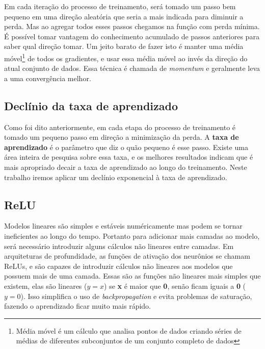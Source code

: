 Em cada iteração do processo de treinamento, será tomado um passo bem
pequeno em uma direção aleatória que seria a mais indicada para
diminuir a perda. Mas ao agregar todos esses passos chegamos na função
com perda mínima. É possível tomar vantagem do conhecimento acumulado
de passos anteriores para saber qual direção tomar. Um jeito barato de
fazer isto é manter uma média móvel\footnote{Média móvel é um cálculo
  que analisa pontos de dados criando séries de médias de diferentes
  subconjuntos de um conjunto completo de dados} de todos os
gradientes, e usar essa média móvel ao invés da direção do atual
conjunto de dados. Essa técnica é chamada de \textit{momentum} e
geralmente leva a uma convergência melhor.

\subsection{Declínio da taxa de aprendizado}

Como foi dito anteriormente, em cada etapa do processo de treinamento
é tomado um pequeno passo em direção a minimização da perda. A {\bf
  taxa de aprendizado} é o parâmetro que diz o quão pequeno é esse
passo. Existe uma área inteira de pesquisa sobre essa taxa, e os
melhores resultados indicam que é mais apropriado decair a taxa de
aprendizado ao longo do treinamento. Neste trabalho iremos aplicar
um declínio exponencial à taxa de aprendizado.\cite{Zeiler}

\subsection{ReLU}

Modelos lineares são simples e estáveis numéricamente mas podem se
tornar ineficientes ao longo do tempo. Portanto para adicionar mais
camadas ao modelo, será necessário introduzir alguns cálculos
não lineares entre camadas. Em arquiteturas de profundidade, as
funções de ativação dos neurônios se chamam ReLUs, e são capazes de
introduzir cálculos não lineares aos modelos que possuem mais de uma
camada. Essas são as funções não lineares mais simples que
existem, elas são lineares ($y=x$) se {\bf x} é maior que {\bf 0},
senão ficam iguais a {\bf 0} ($y=0$). Isso simplifica o uso de
\textit{backpropagation} e evita problemas de saturação, fazendo o
aprendizado ficar muito mais rápido.

